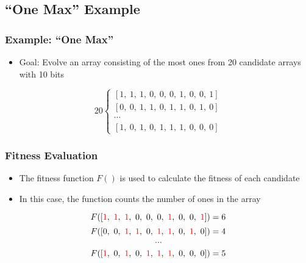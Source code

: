 \documentclass{beamer}
\begin{document}
\subsection*{``One Max'' Example}
\begin{frame}
  \frametitle{Example: ``One Max''}
\begin{itemize}
\item Goal: Evolve an array consisting of the most ones from 20 candidate arrays with 10 bits
\end{itemize}
\[
20 \left\{\begin{matrix}
[  1,~1,~1,~0,~ 0,~0,~1,~0,~0,~1] \\ %
[  0,~0,~1,~1,~ 0,~1,~1,~0,~1,~0] \\
\cdots\\
[  1 ,~0,~1,~0,~ 1,~1,~1,~0,~0,~0] 
\end{matrix}\right.
\]
\end{frame}

\begin{frame}
  \frametitle{Fitness Evaluation}
\begin{itemize}
\item The fitness function $F()$ is used to calculate the fitness of each candidate
\item In this case, the function counts the number of ones in the array
\end{itemize}

\[F([   \textcolor{red}{1},~\textcolor{red}{1},~ \textcolor{red}{1},~0,~ 0,~0,~\textcolor{red}{1},~ 0,~ 0,~ \textcolor{red}{1}]  ) = 6 \]%
\[F([  0 ,~0,~ \textcolor{red}{1},~ \textcolor{red}{1},~ 0,~ \textcolor{red}{1},~ \textcolor{red}{1},~0,~ \textcolor{red}{1},~0]) = 4\]
\[\cdots\]
\[F([   \textcolor{red}{1},~0,~ \textcolor{red}{1},~0,~  \textcolor{red}{1},~ \textcolor{red}{1},~ \textcolor{red}{1},~0,~0,~0]) = 5\]
\end{frame}
\end{document}
